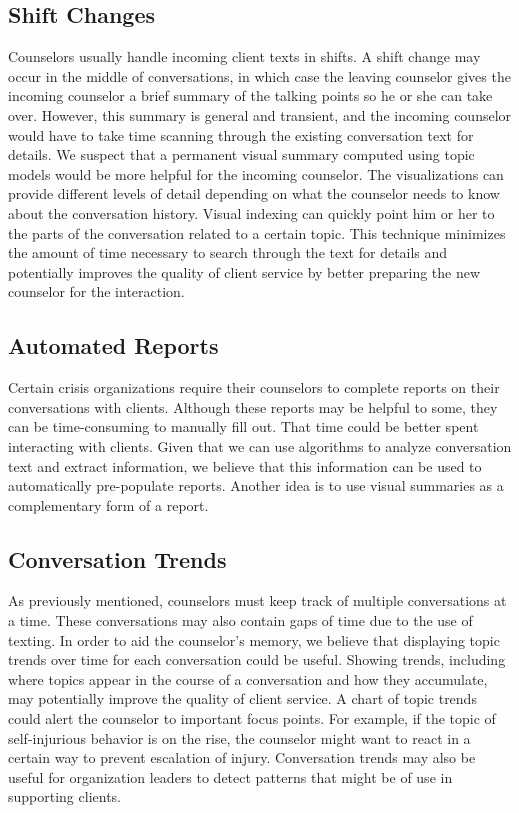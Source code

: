 \subsection{Shift Changes}

Counselors usually handle incoming client texts in shifts. A shift change may occur
in the middle of conversations, in which case the leaving counselor gives the
incoming counselor a brief summary of the talking points so he or she can take
over. However, this summary is general and transient, and the incoming counselor
would have to take time scanning through the existing conversation text for details.
We suspect that a permanent visual summary computed using topic models would be
more helpful for the incoming counselor. The visualizations can provide different
levels of detail depending on what the counselor needs to know about the
conversation history. Visual indexing can quickly point him or her to the parts of
the conversation related to a certain topic. This technique minimizes the amount of
time necessary to search through the text for details and potentially improves the
quality of client service by better preparing the new counselor for the interaction.

\subsection{Automated Reports}

Certain crisis organizations require their counselors to complete reports on their
conversations with clients. Although
these reports may be helpful to some, they can be time-consuming to manually
fill out. That time could be better spent interacting with clients. Given that we can
use algorithms to analyze conversation text and extract information, we believe
that this information can be used to automatically pre-populate reports.
Another idea is to use visual summaries as a complementary form of a report.

\subsection{Conversation Trends}

As previously mentioned, counselors must keep track of multiple conversations
at a time. These conversations may also contain gaps of time due to the use of
texting. In order to aid the counselor's memory, we believe that displaying topic
trends over time for each conversation could be useful. Showing trends, including
where topics appear in the course of a conversation and how they accumulate, may
potentially improve the quality of client service. A chart of topic trends could alert the
counselor to important focus points. For example, if the topic of self-injurious behavior
is on the rise, the counselor might want to react in a certain way to prevent escalation
of injury. Conversation trends may also be useful for organization leaders to detect
patterns that might be of use in supporting clients.

